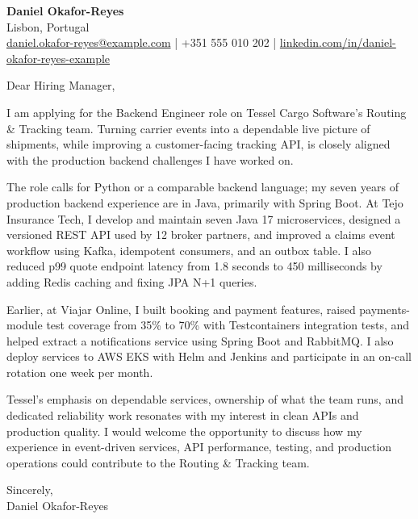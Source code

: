 \documentclass[11pt,a4paper]{article}
\begin{document}
{\large\bfseries\color{primarycolor} Daniel Okafor-Reyes}\\
Lisbon, Portugal\\
\href{mailto:daniel.okafor-reyes@example.com}{daniel.okafor-reyes@example.com} | +351 555 010 202 | \url{linkedin.com/in/daniel-okafor-reyes-example}

Dear Hiring Manager,

I am applying for the Backend Engineer role on Tessel Cargo Software’s Routing \& Tracking team. Turning carrier events into a dependable live picture of shipments, while improving a customer-facing tracking API, is closely aligned with the production backend challenges I have worked on.

The role calls for Python or a comparable backend language; my seven years of production backend experience are in Java, primarily with Spring Boot. At Tejo Insurance Tech, I develop and maintain seven Java 17 microservices, designed a versioned REST API used by 12 broker partners, and improved a claims event workflow using Kafka, idempotent consumers, and an outbox table. I also reduced p99 quote endpoint latency from 1.8 seconds to 450 milliseconds by adding Redis caching and fixing JPA N+1 queries.

Earlier, at Viajar Online, I built booking and payment features, raised payments-module test coverage from 35\% to 70\% with Testcontainers integration tests, and helped extract a notifications service using Spring Boot and RabbitMQ. I also deploy services to AWS EKS with Helm and Jenkins and participate in an on-call rotation one week per month.

Tessel’s emphasis on dependable services, ownership of what the team runs, and dedicated reliability work resonates with my interest in clean APIs and production quality. I would welcome the opportunity to discuss how my experience in event-driven services, API performance, testing, and production operations could contribute to the Routing \& Tracking team.

Sincerely,\\
Daniel Okafor-Reyes
\end{document}
